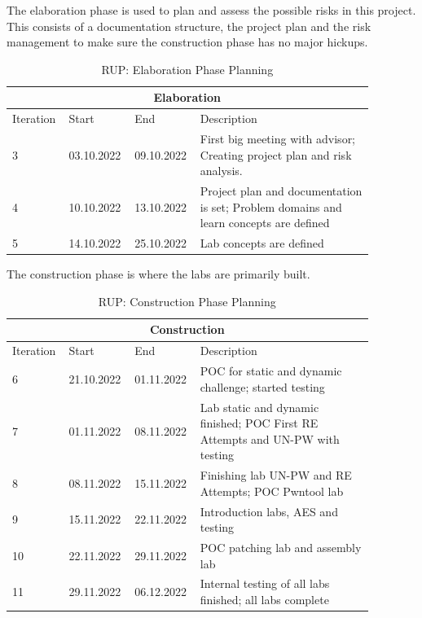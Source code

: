 \noindent The elaboration phase is used to plan and assess the possible risks in this project. This consists of a documentation structure, the project plan and the risk management to make sure the construction phase has no major hickups.
\begin{table}[H]
    \centering
    \begin{tabular}{|p{0.12\linewidth}|p{0.15\linewidth}|p{0.15\linewidth}|p{0.46\linewidth}|}
        \hline
        \multicolumn{4}{||c||}{\textbf{Elaboration}} \\
        \hline \hline
        Iteration & Start & End & Description \\
        \hline \hline
        3 & 03.10.2022 & 09.10.2022 & First big meeting with advisor; Creating project plan and risk analysis.\\
        \hline
        4 & 10.10.2022 & 13.10.2022 & Project plan and documentation is set; Problem domains and learn concepts are defined \\
        \hline
        5 & 14.10.2022 & 25.10.2022 & Lab concepts are defined \\
        \hline
    \end{tabular}
    \caption{RUP: Elaboration Phase Planning}
    \label{elaboration_table}
\end{table}

\noindent The construction phase is where the labs are primarily built. 
\begin{table}[H]
    \centering
    \begin{tabular}{|p{0.12\linewidth}|p{0.15\linewidth}|p{0.15\linewidth}|p{0.46\linewidth}|}
        \hline
        \multicolumn{4}{||c||}{\textbf{Construction}} \\
        \hline \hline
        Iteration & Start & End & Description \\
        \hline \hline
        6 & 21.10.2022 & 01.11.2022 & POC for static and dynamic challenge; started testing \\
        \hline
        7 & 01.11.2022 & 08.11.2022 & Lab static and dynamic finished; POC First RE Attempts and UN-PW with testing \\
        \hline
        8 & 08.11.2022 & 15.11.2022 & Finishing lab UN-PW and RE Attempts; POC Pwntool lab \\
        \hline
        9 & 15.11.2022 & 22.11.2022 & Introduction labs, AES and testing \\
        \hline
        10 & 22.11.2022 & 29.11.2022 & POC patching lab and assembly lab \\
        \hline
        11 & 29.11.2022 & 06.12.2022 & Internal testing of all labs finished; all labs complete\\
        \hline
    \end{tabular}
    \caption{RUP: Construction Phase Planning}
    \label{construction_table}
\end{table}

